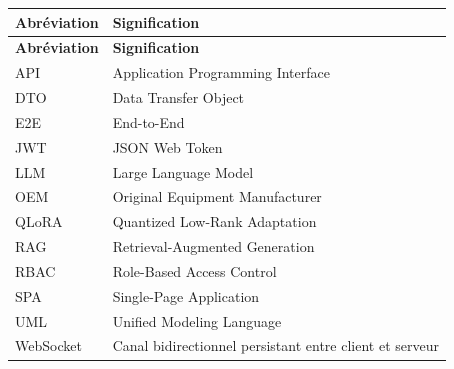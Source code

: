 {\small\singlespacing{}
\begin{longtable}{|>{\raggedright\arraybackslash}p{}|>{\raggedright\arraybackslash}p{}|}
\hline
\rowcolor{tablehead} \color{white}\bfseries Abréviation & \color{white}\bfseries Signification \\ \hline
\endfirsthead
\rowcolor{tablehead} \color{white}\bfseries Abréviation & \color{white}\bfseries Signification \\ \hline
\endhead
\hline\endfoot
API & Application Programming Interface \\ \hline
\rowcolor{tablerow} DTO & Data Transfer Object \\ \hline
E2E & End-to-End \\ \hline
\rowcolor{tablerow} JWT & JSON Web Token \\ \hline
LLM & Large Language Model \\ \hline
\rowcolor{tablerow} OEM & Original Equipment Manufacturer \\ \hline
QLoRA & Quantized Low-Rank Adaptation \\ \hline
\rowcolor{tablerow} RAG & Retrieval-Augmented Generation \\ \hline
RBAC & Role-Based Access Control \\ \hline
\rowcolor{tablerow} SPA & Single-Page Application \\ \hline
UML & Unified Modeling Language \\ \hline
\rowcolor{tablerow} WebSocket & Canal bidirectionnel persistant entre client et serveur \\ \hline
\end{longtable}
}


\clearpage
\listoffigures

\clearpage
{}
